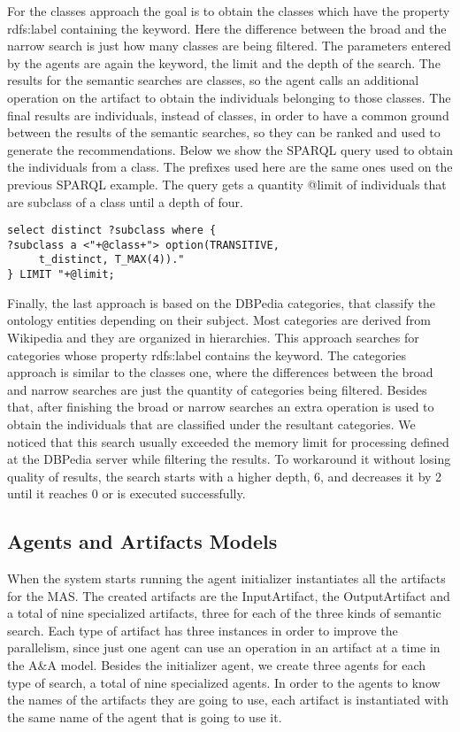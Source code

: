 \documentclass[a4paper,twoside]{article}
\begin{document}
For the classes approach the goal is to obtain the classes which have the property rdfs:label containing the keyword. Here the difference between the broad and the narrow search is just how many classes are being filtered. The parameters entered by the agents are again the keyword, the limit and the depth of the search. The results for the semantic searches are classes, so the agent calls an additional operation on the artifact to obtain the individuals belonging to those classes. The final results are individuals, instead of classes, in order to have a common ground between the results of the semantic searches, so they can be ranked and used to generate the recommendations. Below we show the SPARQL query used to obtain the individuals from a class. The prefixes used here are the same ones used on the previous SPARQL example. The query gets a quantity @limit of individuals that are subclass of a class until a depth of four.

\begin{small}
\begin{verbatim}
select distinct ?subclass where {
?subclass a <"+@class+"> option(TRANSITIVE,
     t_distinct, T_MAX(4))."
} LIMIT "+@limit;
\end{verbatim}
\end{small}

Finally, the last approach is based on the DBPedia categories, that classify the ontology entities depending on their subject. Most categories are derived from Wikipedia and they are organized in hierarchies. This approach searches for categories whose property rdfs:label contains the keyword. The categories approach is similar to the classes one, where the differences between the broad and narrow searches are just the quantity of categories being filtered. Besides that, after finishing the broad or narrow searches an extra operation is used to obtain the individuals that are classified under the resultant categories. We noticed that this search usually exceeded the memory limit for processing defined at the DBPedia server while filtering the results. To workaround it without losing quality of results, the search starts with a higher depth, 6, and decreases it by 2 until it reaches 0 or is executed successfully.


\subsection{Agents and Artifacts Models}

\noindent When the system starts running the agent initializer instantiates all the artifacts for the MAS. The created artifacts are the InputArtifact, the OutputArtifact and a total of nine specialized artifacts, three for each of the three kinds of semantic search. Each type of artifact has three instances in order to improve the parallelism, since just one agent can use an operation in an artifact at a time in the A\&A model. Besides the initializer agent, we create three agents for each type of search, a total of nine specialized agents. In order to the agents to know the names of the artifacts they are going to use, each artifact is instantiated with the same name of the agent that is going to use it.
\end{document}
